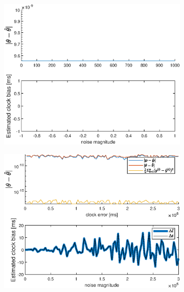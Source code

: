 \begin{figure}[!h]
    \centering %
\begin{subfigure}{0.49\textwidth}
  \includegraphics[width=\linewidth]{Results/SimulationEstPos/noiseFree}
\end{subfigure}\hfil %
\medskip
\begin{subfigure}{0.49\textwidth}
  \includegraphics[width=\linewidth]{Results/SimulationEstPos/clockB}
\end{subfigure}\hfil %
\medskip
\begin{subfigure}{0.49\textwidth}

\end{subfigure}
\end{figure}
